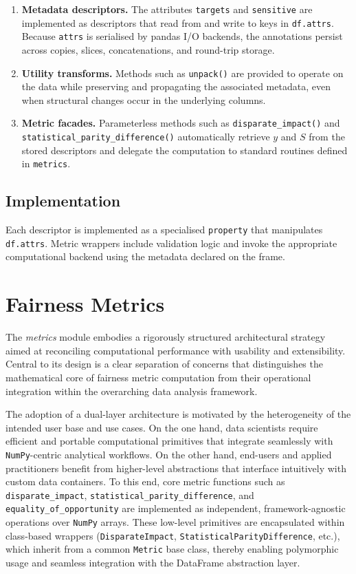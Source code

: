\documentclass[12pt,a4paper,openright,twoside]{book}
\begin{document}
\begin{enumerate}[label=\alph*)]
  \item \textbf{Metadata descriptors.} The attributes \texttt{targets} and \texttt{sensitive} are implemented as descriptors that read from and write to keys in \texttt{df.attrs}. Because \texttt{attrs} is serialised by pandas I/O backends, the annotations persist across copies, slices, concatenations, and round-trip storage.
  \item \textbf{Utility transforms.} Methods such as \texttt{unpack()} are provided to operate on the data while preserving and propagating the associated metadata, even when structural changes occur in the underlying columns.
  \item \textbf{Metric facades.} Parameterless methods such as \texttt{disparate\_impact()} and \texttt{statistical\_parity\_difference()} automatically retrieve $y$ and $S$ from the stored descriptors and delegate the computation to standard routines defined in \texttt{metrics}.
\end{enumerate}

\subsection{Implementation} Each descriptor is implemented as a specialised \texttt{property} that manipulates \texttt{df.attrs}. Metric wrappers include validation logic and invoke the appropriate computational backend using the metadata declared on the frame.

\section{Fairness Metrics}

The \textit{metrics} module embodies a rigorously structured architectural strategy aimed at reconciling computational performance with usability and extensibility. Central to its design is a clear separation of concerns that distinguishes the mathematical core of fairness metric computation from their operational integration within the overarching data analysis framework.

The adoption of a dual-layer architecture is motivated by the heterogeneity of the intended user base and use cases. On the one hand, data scientists require efficient and portable computational primitives that integrate seamlessly with \texttt{NumPy}-centric analytical workflows. On the other hand, end-users and applied practitioners benefit from higher-level abstractions that interface intuitively with custom data containers. To this end, core metric functions such as \texttt{disparate\_impact}, \texttt{statistical\_parity\_difference}, and \texttt{equality\_of\_opportunity} are implemented as independent, framework-agnostic operations over \texttt{NumPy} arrays. These low-level primitives are encapsulated within class-based wrappers (\texttt{DisparateImpact}, \texttt{StatisticalParityDifference}, etc.), which inherit from a common \texttt{Metric} base class, thereby enabling polymorphic usage and seamless integration with the DataFrame abstraction layer.
\end{document}
